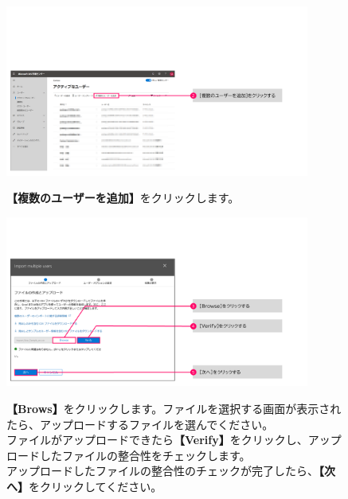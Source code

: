 \begin{figure}[h]
    \begin{minipage}{0.6\textwidth}
        \vspace{-1cm}
        \includegraphics[width=10cm]{figures/CSV_Import-6.png}
    \end{minipage}
    \begin{minipage}{0.4\textwidth}
        \textbf{【複数のユーザーを追加】}をクリックします。
    \end{minipage}
\end{figure}

\begin{figure}[h]
    \begin{minipage}{0.6\textwidth}
        \vspace{-1cm}
        \includegraphics[width=10cm]{figures/CSV_Import-7.png}
    \end{minipage}
    \begin{minipage}{0.4\textwidth}
        \textbf{【Brows】}をクリックします。ファイルを選択する画面が表示されたら、アップロードするファイルを選んでください。\\
        ファイルがアップロードできたら\textbf{【Verify】}をクリックし、アップロードしたファイルの整合性をチェックします。\\
        アップロードしたファイルの整合性のチェックが完了したら、\textbf{【次へ】}をクリックしてください。
    \end{minipage}
\end{figure}

